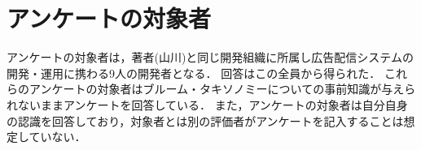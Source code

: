 \section{アンケートの対象者}
アンケートの対象者は，著者(山川)と同じ開発組織に所属し広告配信システムの開発・運用に携わる9人の開発者となる．
回答はこの全員から得られた．
これらのアンケートの対象者はブルーム・タキソノミーについての事前知識が与えられないままアンケートを回答している．
また，アンケートの対象者は自分自身の認識を回答しており，対象者とは別の評価者がアンケートを記入することは想定していない．
